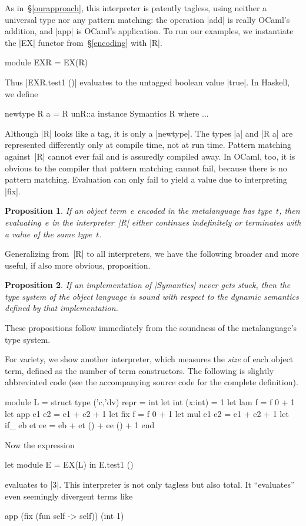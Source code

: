 \documentclass[preprint]{sigplanconf}
\newtheorem{prop}{Proposition}
\begin{document}
As in~\S\ref{ourapproach},
this interpreter is patently tagless, using neither a universal type nor
any pattern matching: the operation |add| is really
OCaml's addition, and |app| is OCaml's application. To run our
examples, we instantiate the |EX| functor from~\S\ref{encoding} with |R|.
\begin{code}
module EXR = EX(R)
\end{code}
Thus |EXR.test1 ()| evaluates to the untagged boolean value |true|.
In Haskell, we define
\begin{code}
newtype R a = R {unR::a}
instance Symantics R where ...
\end{code}
Although |R| looks like a tag, it is only
a |newtype|.  The types |a| and |R a| are represented differently
only at compile time, not at run time.  Pattern matching against~|R|
cannot ever fail and is assuredly compiled away.
In OCaml, too, it is obvious to the compiler that
pattern matching cannot fail, because there is no
pattern matching. Evaluation can only fail to yield a value
due to interpreting |fix|.
\begin{prop}
If an object term~$e$ encoded in the metalanguage has type~$t$,
then evaluating~$e$ in the interpreter~|R| either continues
indefinitely or terminates with a value of the same type~$t$.
\end{prop}
Generalizing from~|R| to all interpreters, we have the following
broader and more useful, if also more obvious, proposition.
\begin{prop}
  If an implementation of |Symantics| never gets stuck, then
  the type system of the object
  language is sound with respect to the dynamic semantics defined by
  that implementation.
\end{prop}
These propositions follow immediately from the soundness of the
metalanguage's type system.

For variety, we show another interpreter, which measures the \emph{size}
of each object term, defined as the number of term
constructors. The following is slightly abbreviated code (see the
accompanying source code for the complete definition).
\begin{code}
module L = struct
  type ('c,'dv) repr = int
  let int (x:int)  = 1
  let lam f        = f 0 + 1
  let app e1 e2    = e1 + e2 + 1
  let fix f        = f 0 + 1
  let mul e1 e2    = e1 + e2 + 1
  let if_ eb et ee = eb + et () + ee () + 1
end
\end{code}
Now the expression
\begin{code}
let module E = EX(L) in E.test1 ()
\end{code}
evaluates to |3|. This interpreter is not only tagless but also
total. It ``evaluates'' even seemingly divergent terms like
\begin{code}
app (fix (fun self -> self)) (int 1)
\end{code}
\end{document}
